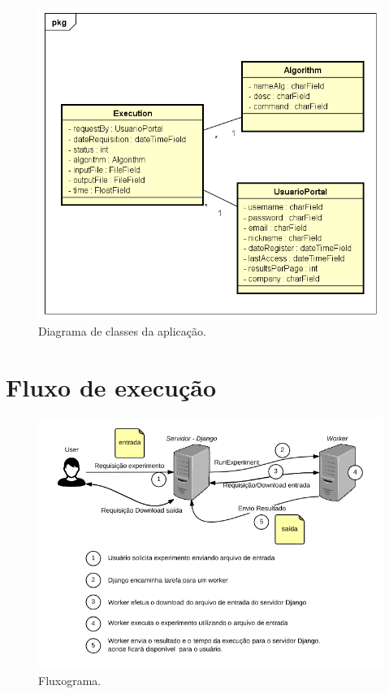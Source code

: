 \documentclass[tg]{mdtufsm}
\begin{document}
\begin{figure}
	\centering
	\includegraphics[width=1\textwidth]{class_diagran_tg}
	\caption{
		Diagrama de classes da aplicação.
	}
	\label{fig:classdiagram}
\end{figure}

\section{Fluxo de execução}

\begin{figure}
	\centering
	\includegraphics[width=1\textwidth]{diagrama}
	\caption{
		Fluxograma.
	}
	\label{fig:diagrama}
\end{figure}
\end{document}
